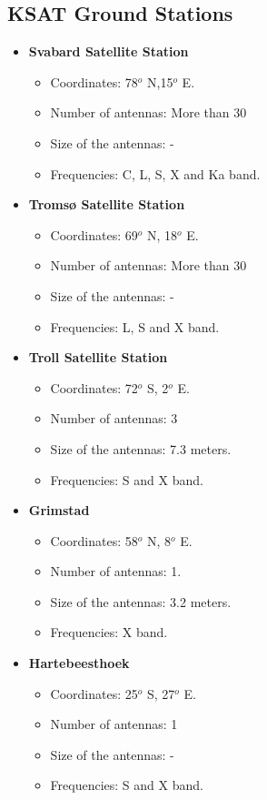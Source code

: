 \subsection{KSAT Ground Stations}
\begin{itemize}
\item \textbf{Svabard Satellite Station}
\begin{itemize}
\item Coordinates: 78$^{o}$ N,15$^{o}$ E.
\item Number of antennas: More than 30
\item Size of the antennas: -
\item Frequencies: C, L, S, X and Ka band.
\end{itemize}
\item \textbf{Tromsø Satellite Station}
\begin{itemize}
\item Coordinates: 69$^{o}$ N, 18$^{o}$ E.
\item Number of antennas: More than 30
\item Size of the antennas: -
\item Frequencies: L, S and X band.
\end{itemize}
\item \textbf{Troll Satellite Station}
\begin{itemize}
\item Coordinates: 72$^{o}$ S, 2$^{o}$ E.
\item Number of antennas: 3
\item Size of the antennas: 7.3 meters.
\item Frequencies: S and X band.
\end{itemize}
\item \textbf{Grimstad}
\begin{itemize}
\item Coordinates: 58$^{o}$ N, 8$^{o}$ E.
\item Number of antennas: 1.
\item Size of the antennas: 3.2 meters.
\item Frequencies: X band.
\end{itemize}
\item \textbf{Hartebeesthoek}
\begin{itemize}
\item Coordinates: 25$^{o}$ S, 27$^{o}$ E.
\item Number of antennas: 1
\item Size of the antennas: -
\item Frequencies: S and X band.

\end{itemize}
\end{itemize}
